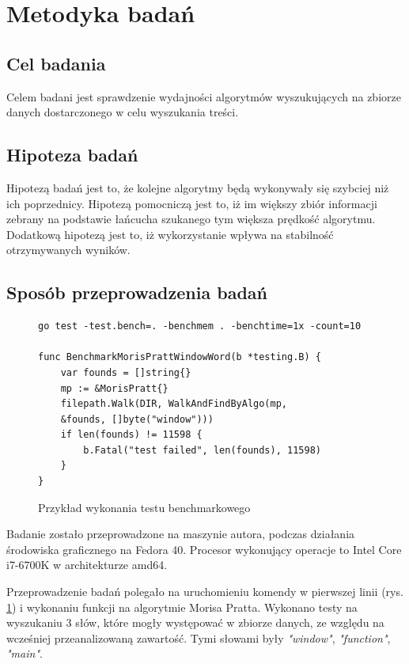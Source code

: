 \section{Metodyka badań}

\subsection{Cel badania}

Celem badani jest sprawdzenie wydajności algorytmów wyszukujących na zbiorze
danych dostarczonego w celu wyszukania treści.

\subsection{Hipoteza badań}

Hipotezą badań jest to, że kolejne algorytmy będą wykonywały się szybciej niż ich
poprzednicy. Hipotezą pomocniczą jest to, iż im większy zbiór informacji zebrany
na podstawie łańcucha szukanego tym większa prędkość algorytmu. Dodatkową hipotezą jest
to, iż wykorzystanie  wpływa na stabilność 
otrzymywanych wyników.

\subsection{Sposób przeprowadzenia badań}

\begin{figure}[h]
  \centering
  \begin{lstlisting}
go test -test.bench=. -benchmem . -benchtime=1x -count=10

func BenchmarkMorisPrattWindowWord(b *testing.B) {
	var founds = []string{}
	mp := &MorisPratt{}
	filepath.Walk(DIR, WalkAndFindByAlgo(mp,
    &founds, []byte("window")))
	if len(founds) != 11598 {
		b.Fatal("test failed", len(founds), 11598)
	}
}
  \end{lstlisting}
  \caption{Przykład wykonania testu benchmarkowego}
  \label{fig:code:examplePerfTest}
\end{figure}
Badanie zostało przeprowadzone na maszynie autora, podczas działania środowiska
graficznego na Fedora 40. Procesor wykonujący operacje to Intel Core i7-6700K
w architekturze amd64.

Przeprowadzenie badań polegało na uruchomieniu komendy w pierwszej linii (rys. 
\ref{fig:code:examplePerfTest}) i wykonaniu funkcji na algorytmie Morisa Pratta. 
Wykonano testy na wyszukaniu 3 słów, które mogły występować w zbiorze danych,
ze względu na wcześniej przeanalizowaną zawartość. Tymi słowami były 
\textit{"window"}, \textit{"function"}, \textit{"main"}.

